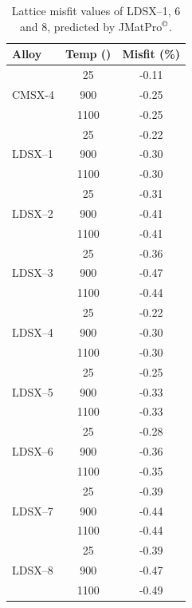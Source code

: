 \begin{table}[H]
\begin{center}
\begin{tabular}{l c c } 
\hline
\hline
Alloy&	Temp (\celsius) &	Misfit (\%)\\
\hline
&	25	&-0.11\\
CMSX-4	&900	&-0.25\\
	&1100&-0.25\\
	\hline
&	25	&-0.22\\
LDSX--1	&900	&-0.30\\
	&1100&	-0.30\\
	\hline
&	25	&-0.31\\
LDSX--2	&900	&-0.41\\
	&1100&	-0.41\\
	\hline
&	25&	-0.36\\
LDSX--3	&900&	-0.47\\
	&1100&	-0.44\\
	\hline
&	25	&-0.22\\
LDSX--4	&900	&-0.30\\
	&1100&	-0.30\\\hline
&	25&	-0.25\\
LDSX--5	&900	&-0.33\\
	&1100&	-0.33\\
	\hline
&	25&	-0.28\\
LDSX--6	&900	&-0.36\\
	&1100&	-0.35\\
	\hline
&	25&	-0.39\\
LDSX--7	&900	&-0.44\\
	&1100&	-0.44\\
	\hline
&	25&	-0.39\\
LDSX--8	&	900&	-0.47\\
	&	1100&	-0.49\\
\hline
\hline
\end{tabular}
\end{center}
\caption{Lattice misfit values of LDSX--1, 6 and 8, predicted by JMatPro$^{\copyright}$. }
\label{tab:misfitjmatpro}
\end{table}